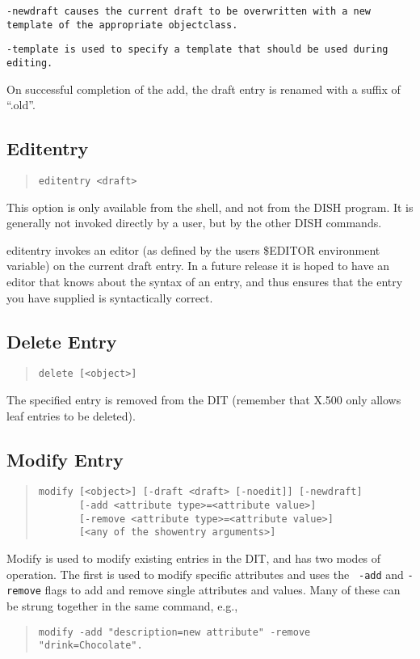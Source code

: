 \tt -newdraft\rm \ causes the current draft to be overwritten with a new
template of the appropriate objectclass.

\tt -template\rm \ is used to specify a template that should be used during
editing.

On successful completion of the add, the draft entry is renamed with a suffix of
``.old''.

\subsection{Editentry}

\begin{quote}\begin{verbatim}
editentry <draft>
\end{verbatim}\end{quote}

This option is only available from the shell, and not from the DISH
program.  It is generally not invoked directly by a user, but by the
other DISH commands.

editentry invokes an editor (as defined by the users
\$EDITOR environment variable) on the current draft entry.
In a future release it is hoped to have an editor that knows about the syntax
of an entry, and thus ensures that the entry you have supplied is syntactically
correct.

\subsection {Delete Entry}
\begin{quote}\begin{verbatim}
delete [<object>]
\end{verbatim}\end{quote}
The specified entry is removed from the DIT (remember that 
X.500 only allows leaf
entries to be deleted).

\subsection {Modify Entry}
\label{dish:modify}
\begin{quote}\begin{verbatim}
modify [<object>] [-draft <draft> [-noedit]] [-newdraft] 
       [-add <attribute type>=<attribute value>]
       [-remove <attribute type>=<attribute value>]
       [<any of the showentry arguments>]
\end{verbatim}\end{quote}
Modify is used to modify existing entries in the DIT, and has two modes of
operation. The first is used to modify specific attributes and uses the {\tt
-add} and {\tt -remove} flags to add and remove single attributes and
values. Many of these can be strung together in the same command, e.g.,
\begin{quote}\smaller\begin{verbatim}
modify -add "description=new attribute" -remove "drink=Chocolate".
\end{verbatim}\end{quote}

